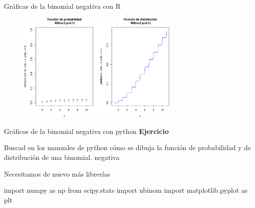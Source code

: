 \documentclass[
  ignorenonframetext,
  aspectratio=169]{beamer}
\newenvironment{Shaded}{\begin{snugshade}}{\end{snugshade}}
\newcommand{\ImportTok}[1]{\textcolor[rgb]{0.00,0.46,0.62}{#1}}
\newcommand{\NormalTok}[1]{\textcolor[rgb]{0.00,0.23,0.31}{#1}}
\begin{document}
\begin{frame}{Gráficas de la binomial negativa con R}
\protect\hypertarget{gruxe1ficas-de-la-binomial-negativa-con-r-1}{}
\begin{figure}

{\centering \includegraphics[width=0.7\textwidth,height=\textheight]{Tema_3_1_Notables_files/figure-beamer/unnamed-chunk-32-1.pdf}

}

\end{figure}
\end{frame}

\begin{frame}[fragile]{Gráficos de la binomial negativa con python}
\protect\hypertarget{gruxe1ficos-de-la-binomial-negativa-con-python}{}
\textbf{Ejercicio}

Buscad en los manuales de python cómo se dibuja la función de
probabilidad y de distribución de una binomial. negativa

Necesitamos de nuevo más librerías

\begin{Shaded}
\begin{Highlighting}[]
\ImportTok{import}\NormalTok{ numpy }\ImportTok{as}\NormalTok{ np}
\ImportTok{from}\NormalTok{ scipy.stats }\ImportTok{import}\NormalTok{ nbinom}
\ImportTok{import}\NormalTok{ matplotlib.pyplot }\ImportTok{as}\NormalTok{ plt}
\end{Highlighting}
\end{Shaded}
\end{frame}
\end{document}
